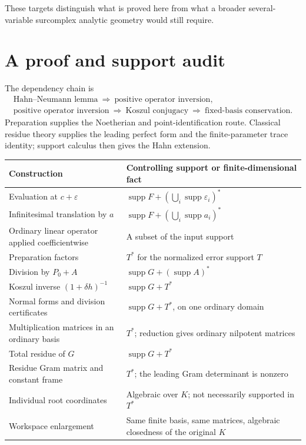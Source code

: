 \documentclass[11pt]{article}
\theoremstyle{definition}
\newcommand{\supp}{\operatorname{supp}}
\newcommand{\eps}{\varepsilon}
\begin{document}
These targets distinguish what is proved here from what a broader several-variable surcomplex analytic geometry would still require.

\appendix
\section{A proof and support audit}\label{app:audit}
The dependency chain is
\begin{gather*}
 \text{Hahn--Neumann lemma}
 \ \Longrightarrow\ \text{positive operator inversion},\\
 \text{positive operator inversion}
 \ \Longrightarrow\ \text{Koszul conjugacy}
 \ \Longrightarrow\ \text{fixed-basis conservation}.
\end{gather*}
Preparation supplies the Noetherian and point-identification route. Classical residue theory supplies the leading perfect form and the finite-parameter trace identity; support calculus then gives the Hahn extension.

\begin{center}\small
\begin{longtable}{@{}L{0.39\textwidth}L{0.52\textwidth}@{}}
\toprule
Construction & Controlling support or finite-dimensional fact\\
\midrule
\endhead
Evaluation at $c+\eps$ & $\supp F+(\bigcup_i\supp\eps_i)^*$\\[0.4em]
Infinitesimal translation by $a$ & $\supp F+(\bigcup_i\supp a_i)^*$\\[0.4em]
Ordinary linear operator applied coefficientwise & A subset of the input support\\[0.4em]
Preparation factors & $T^*$ for the normalized error support $T$\\[0.4em]
Division by $P_0+A$ & $\supp G+(\supp A)^*$\\[0.4em]
Koszul inverse $(1+\delta h)^{-1}$ & $\supp G+T^*$\\[0.4em]
Normal forms and division certificates & $\supp G+T^*$, on one ordinary domain\\[0.4em]
Multiplication matrices in an ordinary basis & $T^*$; reduction gives ordinary nilpotent matrices\\[0.4em]
Total residue of $G$ & $\supp G+T^*$\\[0.4em]
Residue Gram matrix and constant frame & $T^*$; the leading Gram determinant is nonzero\\[0.4em]
Individual root coordinates & Algebraic over $K$; not necessarily supported in $T^*$\\[0.4em]
Workspace enlargement & Same finite basis, same matrices, algebraic closedness of the original $K$\\
\bottomrule
\end{longtable}
\end{center}
\end{document}
